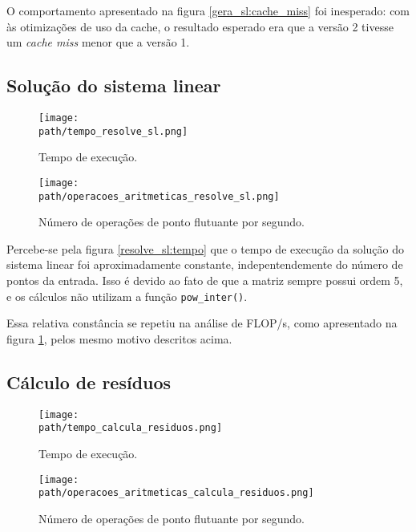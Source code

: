 \documentclass[a4paper, 11pt]{article}
\begin{document}
O comportamento apresentado na figura \ref{gera_sl:cache_miss} foi inesperado: com
às otimizações de uso da cache, o resultado esperado era que a versão 2 tivesse um
\textit{cache miss} menor que a versão 1.

\subsection{Solução do sistema linear}
\begin{figure}[H]
    \centering
    \begin{minipage}{.5\textwidth}
        \centering
        \texttt{[image: \\path/tempo\_resolve\_sl.png]}
        \caption{Tempo de execução.}
        \label{resolve_sl:tempo}
    \end{minipage}\hfill
    \begin{minipage}{.5\textwidth}
        \centering
        \texttt{[image: \\path/operacoes\_aritmeticas\_resolve\_sl.png]}
        \caption{Número de operações de ponto flutuante por segundo.}
        \label{resolve_sl:flops}
    \end{minipage}
\end{figure}

Percebe-se pela figura \ref{resolve_sl:tempo} que o tempo de execução da
solução do sistema linear foi aproximadamente constante, indepentendemente
do número de pontos da entrada. Isso é devido ao fato de que a matriz sempre
possui ordem 5, e os cálculos não utilizam a função \texttt{pow\_inter()}.

Essa relativa constância se repetiu na análise de FLOP/s, como apresentado na figura
\ref{resolve_sl:flops}, pelos mesmo motivo descritos acima.

\subsection{Cálculo de resíduos}
\begin{figure}[H]
    \centering
    \begin{minipage}{.5\textwidth}
        \centering
        \texttt{[image: \\path/tempo\_calcula\_residuos.png]}
        \caption{Tempo de execução.}
        \label{calcula_residuos:tempo}
    \end{minipage}\hfill
    \begin{minipage}{.5\textwidth}
        \centering
        \texttt{[image: \\path/operacoes\_aritmeticas\_calcula\_residuos.png]}
        \caption{Número de operações de ponto flutuante por segundo.}
        \label{calcula_residuos:flops}
    \end{minipage}
\end{figure}
\end{document}
